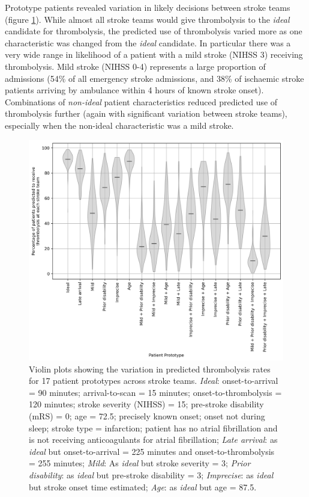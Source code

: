 Prototype patients revealed variation in likely decisions between stroke teams (figure \ref{fig:thrombolysis_rates_prototype_patients}). While almost all stroke teams would give thrombolysis to the \textit{ideal} candidate for thrombolysis, the predicted use of thrombolysis varied more as one characteristic was changed from the \textit{ideal} candidate. In particular there was a very wide range in likelihood of a patient with a mild stroke (NIHSS 3) receiving thrombolysis. Mild stroke (NIHSS 0-4) represents a large proportion of admissions (54\% of all emergency stroke admissions, and 38\% of ischaemic stroke patients arriving by ambulance within 4 hours of known stroke onset). Combinations of \textit{non-ideal} patient characteristics reduced predicted use of thrombolysis further (again with significant variation between stroke teams), especially when the non-ideal characteristic was a mild stroke.

\begin{figure}
    \centering
    \includegraphics[width=0.75\linewidth]{images/p5_prototype_decision.png}
    \caption{Violin plots showing the variation in predicted thrombolysis rates for 17 patient prototypes across stroke teams. \textit{Ideal}: onset-to-arrival = 90 minutes; arrival-to-scan = 15 minutes; onset-to-thrombolysis = 120 minutes; stroke severity (NIHSS) = 15; pre-stroke disability (mRS) = 0; age = 72.5; precisely known onset; onset not during sleep; stroke type = infarction; patient has no atrial fibrillation and is not receiving anticoagulants for atrial fibrillation; \textit{Late arrival}: as \textit{ideal} but onset-to-arrival = 225 minutes and onset-to-thrombolysis = 255 minutes; \textit{Mild}: As \textit{ideal} but stroke severity = 3; \textit{Prior disability}: as \textit{ideal} but pre-stroke disability = 3; \textit{Imprecise}: as \textit{ideal} but stroke onset time estimated; \textit{Age}: as \textit{ideal} but age = 87.5.}
    \label{fig:thrombolysis_rates_prototype_patients}
\end{figure}

